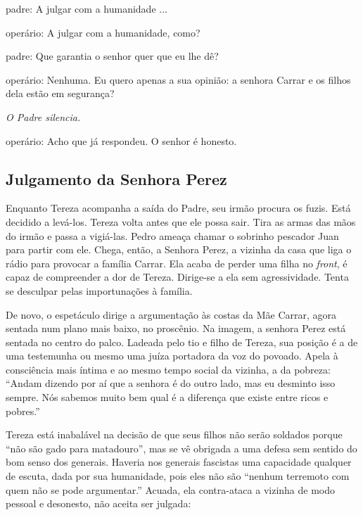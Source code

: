 {\sc padre}: A julgar com a humanidade ...

{\sc operário}: A julgar com a humanidade, como?

{\sc padre}: Que garantia o senhor quer que eu lhe dê?

{\sc operário}: Nenhuma. Eu quero apenas a sua opinião: a senhora Carrar e os
filhos dela estão em segurança?

{\it O Padre silencia.}

{\sc operário}: Acho que já respondeu. O senhor é honesto.


\subsection{Julgamento da Senhora Perez}

Enquanto Tereza acompanha a saída do Padre, seu irmão procura os fuzis.
Está decidido a levá-los. Tereza volta antes que ele possa sair. Tira as
armas das mãos do irmão e passa a vigiá-las. Pedro ameaça chamar o
sobrinho pescador Juan para partir com ele. Chega, então, a Senhora
Perez, a vizinha da casa que liga o rádio para provocar a família
Carrar. Ela acaba de perder uma filha no {\it front}, é capaz de
compreender a dor de Tereza. Dirige-se a ela sem agressividade. Tenta se
desculpar pelas importunações à família.

De novo, o espetáculo dirige a argumentação às costas da Mãe Carrar,
agora sentada num plano mais baixo, no proscênio. Na imagem, a senhora
Perez está sentada no centro do palco. Ladeada pelo tio e filho de
Tereza, sua posição é a de uma testemunha ou mesmo uma juíza portadora
da voz do povoado. Apela à consciência mais íntima e ao mesmo tempo
social da vizinha, a da pobreza: “Andam dizendo por aí que a senhora é
do outro lado, mas eu desminto isso sempre. Nós sabemos muito bem qual é
a diferença que existe entre ricos e pobres.”

Tereza está inabalável na decisão de que seus filhos não serão soldados
porque “não são gado para matadouro”, mas se vê obrigada a uma defesa
sem sentido do bom senso dos generais. Haveria nos generais fascistas
uma capacidade qualquer de escuta, dada por sua humanidade, pois eles
não são “nenhum terremoto com quem não se pode argumentar.” Acuada, ela
contra-ataca a vizinha de modo pessoal e desonesto, não aceita ser
julgada:

